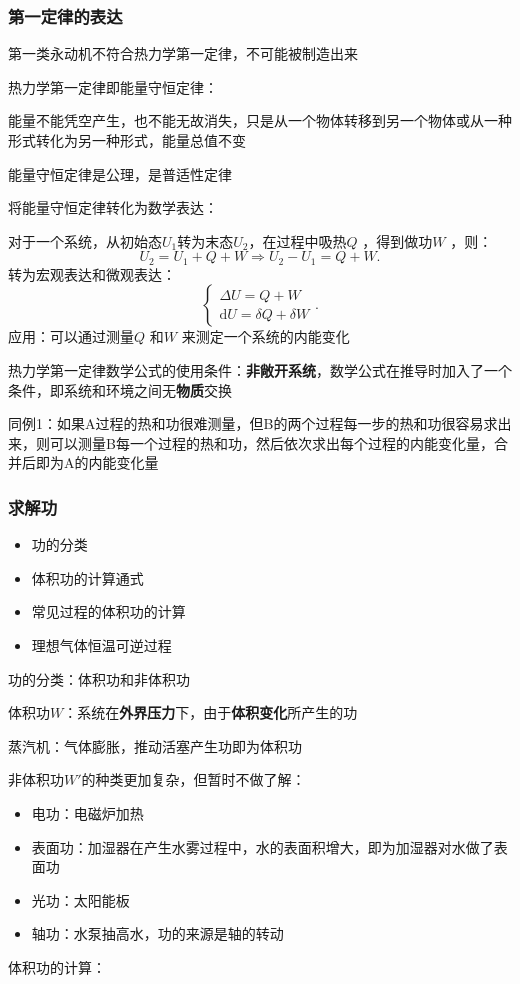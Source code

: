 \subsubsection*{第一定律的表达}%
\label{subsub*:第一定律的表达}
\begin{notation}
    第一类永动机不符合热力学第一定律，不可能被制造出来
\end{notation}
热力学第一定律即能量守恒定律：
\begin{defi}
    能量不能凭空产生，也不能无故消失，只是从一个物体转移到另一个物体或从一种形式转化为另一种形式，能量总值不变
\end{defi}
\begin{notation}
    能量守恒定律是公理，是普适性定律
\end{notation}
将能量守恒定律转化为数学表达：

对于一个系统，从初始态$U_1$转为末态$U_2$，在过程中吸热$Q$ ，得到做功$W$ ，则：\[
    U_2=U_1+Q+W\Rightarrow U_2-U_1=Q+W
.\]
转为宏观表达和微观表达：\[
    \begin{cases}
        \Delta U = Q+W\\
        \mathrm{d}U = \delta Q+\delta W
    \end{cases}
.\]
应用：可以通过测量$Q$ 和$W$ 来测定一个系统的内能变化
\begin{notation}
    热力学第一定律数学公式的使用条件：\textbf{非敞开系统}，数学公式在推导时加入了一个条件，即系统和环境之间无\textbf{物质}交换
\end{notation}
\begin{eg}
    同例1：如果A过程的热和功很难测量，但B的两个过程每一步的热和功很容易求出来，则可以测量B每一个过程的热和功，然后依次求出每个过程的内能变化量，合并后即为A的内能变化量
\end{eg}
\subsubsection*{求解功}%
\label{subsub*:求解功}
\begin{itemize}
    \item 功的分类
    \item 体积功的计算通式
    \item 常见过程的体积功的计算
    \item 理想气体恒温可逆过程
\end{itemize}
功的分类：体积功和非体积功
\begin{defi}
    体积功$W$：系统在\textbf{外界压力}下，由于\textbf{体积变化}所产生的功
\end{defi}
\begin{eg}
    蒸汽机：气体膨胀，推动活塞产生功即为体积功
\end{eg}
非体积功$W'$的种类更加复杂，但暂时不做了解：
\begin{itemize}
    \item 电功：电磁炉加热
    \item 表面功：加湿器在产生水雾过程中，水的表面积增大，即为加湿器对水做了表面功
    \item 光功：太阳能板
    \item 轴功：水泵抽高水，功的来源是轴的转动
\end{itemize}
体积功的计算：

